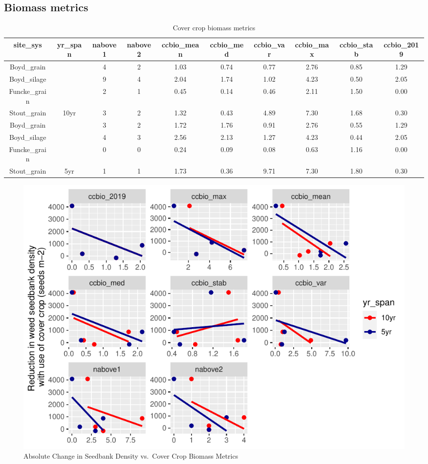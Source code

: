 \documentclass[]{article}
\begin{document}
\hypertarget{biomass-metrics}{%
\subsection{Biomass metrics}\label{biomass-metrics}}

\begin{table}[H]

\caption{\label{tab:unnamed-chunk-7}Cover crop biomass metrics}
\centering
\begin{tabular}[t]{cccccccccc}
\toprule
site\_sys & yr\_span & nabove1 & nabove2 & ccbio\_mean & ccbio\_med & ccbio\_var & ccbio\_max & ccbio\_stab & ccbio\_2019\\
\midrule
\rowcolor{gray!6}  Boyd\_grain &  & 4 & 2 & 1.03 & 0.74 & 0.77 & 2.76 & 0.85 & 1.29\\

Boyd\_silage &  & 9 & 4 & 2.04 & 1.74 & 1.02 & 4.23 & 0.50 & 2.05\\

\rowcolor{gray!6}  Funcke\_grain &  & 2 & 1 & 0.45 & 0.14 & 0.46 & 2.11 & 1.50 & 0.00\\

Stout\_grain & \multirow{-4}{*}{\centering\arraybackslash 10yr} & 3 & 2 & 1.32 & 0.43 & 4.89 & 7.30 & 1.68 & 0.30\\
\cmidrule{1-10}
\rowcolor{gray!6}  Boyd\_grain &  & 3 & 2 & 1.72 & 1.76 & 0.91 & 2.76 & 0.55 & 1.29\\

Boyd\_silage &  & 4 & 3 & 2.56 & 2.13 & 1.27 & 4.23 & 0.44 & 2.05\\

\rowcolor{gray!6}  Funcke\_grain &  & 0 & 0 & 0.24 & 0.09 & 0.08 & 0.63 & 1.16 & 0.00\\

Stout\_grain & \multirow{-4}{*}{\centering\arraybackslash 5yr} & 1 & 1 & 1.73 & 0.36 & 9.71 & 7.30 & 1.80 & 0.30\\
\bottomrule
\end{tabular}
\end{table}

\begin{figure}
\centering
\includegraphics{supp-mat_files/figure-latex/unnamed-chunk-8-1.pdf}
\caption{Absolute Change in Seedbank Density vs.~Cover Crop Biomass
Metrics}
\end{figure}
\end{document}
